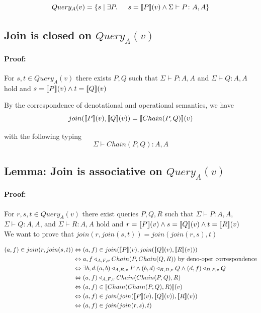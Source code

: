 \documentclass[12pt,a4paper,twoside,openright]{report}
\newcommand{\db}[1]{{\bf [\![}#1{\bf ]\!]}}
\newcommand{\deno}[1]{\db{#1}(v)}
\newcommand{\setComp}[2]{\left\lbrace #1 \mid #2 \right\rbrace}
\newcommand{\typeRule}[2]{\Sigma\vdash #1 \colon #2}
\newcommand{\denoRule}[2]{#1 \in \deno{#2}}
\newcommand{\opRule}[3]{#1 \triangleleft_{#2, v} #3}
\newcommand{\queryT}[1]{Query_{#1}(v)}
\begin{document}
\begin{equation}
	\queryT{A} = \setComp{s}{\exists P.\indent s = \deno{P} \wedge \typeRule{P}{A, A}}
\end{equation}

\subsection{Join is closed on $\queryT{A}$}
\paragraph{Proof:}For $s, t \in \queryT{A}$ there exists $P, Q$ such that $\typeRule{P}{A, A}$ and $\typeRule{Q}{A, A}$ hold and $s = \deno{P} \wedge t = \deno{Q}$

By the correspondence of denotational and operational semantics, we have
	\begin{equation}
		join(\deno{P}, \deno{Q}) = \deno{Chain(P, Q)}
	\end{equation}
	
	with the following typing
	\begin{equation}
	\typeRule{Chain(P, Q)}{A, A}
	\end{equation}
	 
\subsection{Lemma: Join is associative on $\queryT{A}$}
\paragraph{Proof:} For $r, s, t \in \queryT{A}$ there exist queries $P, Q, R$ such that $\typeRule{P}{A, A}$, $\typeRule{Q}{A, A}$, and $\typeRule{R}{A, A}$  hold and $r = \deno{P} \wedge s = \deno{Q} \wedge t = \deno{R}$
\\We want to prove that $join(r, join(s, t)) = join(join(r, s), t)$

\begin{equation}\label{Well typed}
\begin{split}
(a, f) \in join(r, join(s, t)) & \Leftrightarrow (a, f) \in join(\deno{P}, join(\deno{Q},\deno{R}))\\
							  & \Leftrightarrow \opRule{a,f}{A, F}{Chain(P, Chain(Q, R))} \mbox{ by deno-oper correspondence}\\
							& \Leftrightarrow \exists b, d. \opRule{(a, b)}{A, B}{P} \wedge \opRule{(b,d)}{B,D}{Q} \wedge \opRule{(d,f)}{D,F}{Q}\\
							& \Leftrightarrow \opRule{(a, f)}{A, F}{Chain(Chain(P, Q), R)}\\
							& \Leftrightarrow \denoRule{(a, f)}{Chain(Chain(P, Q), R)}\\
							& \Leftrightarrow (a, f) \in join(join(\deno{P}, \deno{Q}), \deno{R})\\
							& \Leftrightarrow (a, f) \in join(join(r, s), t)\\							
\end{split}
\end{equation}
\end{document}
